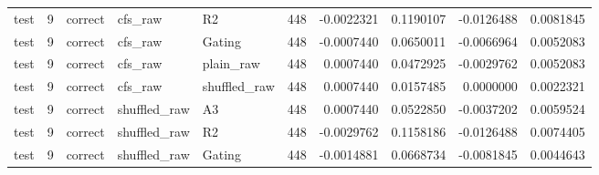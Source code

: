 \begin{tabular}{lrlllrrrrr}
test & 9 & correct & cfs_raw & R2 & 448 & -0.0022321 & 0.1190107 & -0.0126488 & 0.0081845 \\
test & 9 & correct & cfs_raw & Gating & 448 & -0.0007440 & 0.0650011 & -0.0066964 & 0.0052083 \\
test & 9 & correct & cfs_raw & plain_raw & 448 & 0.0007440 & 0.0472925 & -0.0029762 & 0.0052083 \\
test & 9 & correct & cfs_raw & shuffled_raw & 448 & 0.0007440 & 0.0157485 & 0.0000000 & 0.0022321 \\
test & 9 & correct & shuffled_raw & A3 & 448 & 0.0007440 & 0.0522850 & -0.0037202 & 0.0059524 \\
test & 9 & correct & shuffled_raw & R2 & 448 & -0.0029762 & 0.1158186 & -0.0126488 & 0.0074405 \\
test & 9 & correct & shuffled_raw & Gating & 448 & -0.0014881 & 0.0668734 & -0.0081845 & 0.0044643 \\
\bottomrule
\end{tabular}
